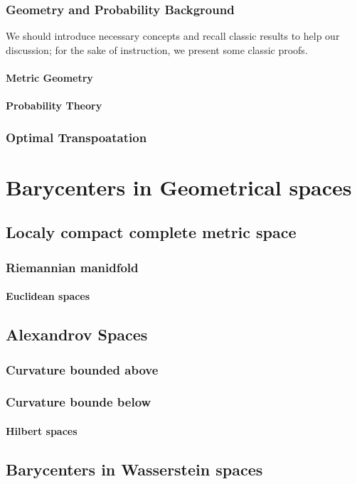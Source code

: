 \documentclass{report}
\begin{document}
\section{Geometry and Probability Background}
We should introduce necessary concepts and recall classic results to help our discussion; for the sake of instruction, we present some classic proofs.
\subsection{Metric Geometry}
\subsection{Probability Theory}

\section{Optimal Transpoatation}

\part{Barycenters in Geometrical spaces}

\chapter{Localy compact complete metric space}

\section{Riemannian manidfold}
\subsection{Euclidean spaces}

\chapter{Alexandrov Spaces}
\section{Curvature bounded above}
\section{Curvature bounde below}
\subsection{Hilbert spaces}

\chapter{Barycenters in Wasserstein spaces}

\printbibliography
\end{document}
